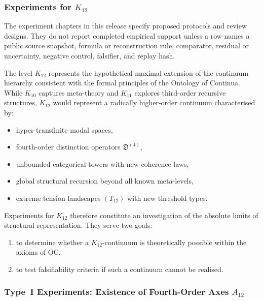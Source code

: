 
\subsubsection{Experiments for $K_{12}$}

The experiment chapters in this release specify proposed protocols and review designs. They do not report completed empirical support unless a row names a public source snapshot, formula or reconstruction rule, comparator, residual or uncertainty, negative control, falsifier, and replay hash.
\label{sec:experiments-k12}

The level $K_{12}$ represents the hypothetical maximal extension of
the continuum hierarchy consistent with the formal principles of the
Ontology of Continua.
While $K_{10}$ captures meta-theory and $K_{11}$ explores
third-order recursive structures, $K_{12}$ would represent a
radically higher-order continuum characterised by:

\begin{itemize}
    \item hyper-transfinite modal spaces,
    \item fourth-order distinction operators $\mathfrak{D}^{(4)}$,
    \item unbounded categorical towers with new coherence laws,
    \item global structural recursion beyond all known meta-levels,
    \item extreme tension landscapes $(T_{12})$ with new threshold types.
\end{itemize}

Experiments for $K_{12}$ therefore constitute an investigation of the
absolute limits of structural representation.
They serve two goals:

\begin{enumerate}
    \item to determine whether a $K_{12}$-continuum is theoretically
          possible within the axioms of OC,
    \item to test falsifiability criteria if such a continuum
          cannot be realised.
\end{enumerate}



\subsubsection{Type~I Experiments: Existence of Fourth-Order Axes $A_{12}$}

